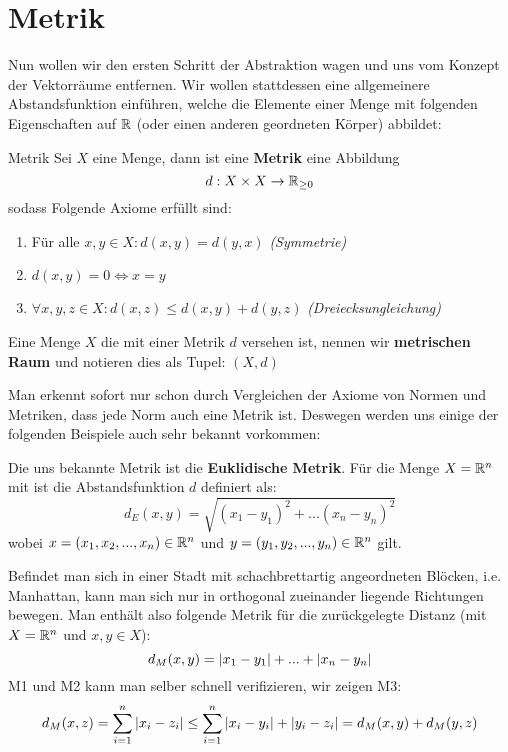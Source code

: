 \section{Metrik}
Nun wollen wir den ersten Schritt der Abstraktion wagen und uns vom Konzept der Vektorräume entfernen. Wir wollen stattdessen eine allgemeinere Abstandsfunktion einführen, welche die Elemente einer Menge mit folgenden Eigenschaften auf $\mathbb{R}$ (oder einen anderen geordneten Körper) abbildet:
\begin{definition}{Metrik}{}
Sei $X$ eine Menge, dann ist eine \textbf{Metrik} eine Abbildung
$$d: X\times X \to \mathbb{R}_{\geq 0}$$
sodass Folgende Axiome erfüllt sind:
\begin{enumerate}[label=M\arabic*)]
    \item Für alle $x,y \in X : d(x,y) = d(y,x)$ \hfill \textit{(Symmetrie)}
    \item $d(x,y) = 0 \iff x=y$
    \item $\forall x,y,z \in X: d(x,z) \leq d(x,y) + d(y,z)$ \hfill \textit{(Dreiecksungleichung)}
\end{enumerate}
Eine Menge $X$ die mit einer Metrik $d$ versehen ist, nennen wir \textbf{metrischen Raum} und notieren dies als Tupel: $(X, d)$
\end{definition}

Man erkennt sofort nur schon durch Vergleichen der Axiome von Normen und Metriken, dass jede Norm auch eine Metrik ist. Deswegen werden uns einige der folgenden Beispiele auch sehr bekannt vorkommen:

\begin{example} Die uns bekannte Metrik ist die \textbf{Euklidische Metrik}. Für die Menge $X = \mathbb{R}^n$ mit ist die Abstandsfunktion $d$ definiert als:
$$d_E(x,y) = \sqrt{(x_1-y_1)^2+...(x_n-y_n)^2}$$
wobei $x = (x_1, x_2, ..., x_n) \in \mathbb{R}^n$ und $y = (y_1, y_2, ..., y_n) \in \mathbb{R}^n$ gilt.
\end{example}

\begin{example} Befindet man sich in einer Stadt mit schachbrettartig angeordneten Blöcken, i.e. Manhattan, kann man sich nur in orthogonal zueinander liegende Richtungen bewegen. Man enthält also folgende Metrik für die zurückgelegte Distanz (mit $X = \mathbb{R}^n$ und $x,y \in X$):
$$d_M(x,y) = \left|x_1 - y_1\right| + ... + \left|x_n - y_n\right|$$
M1 und M2 kann man selber schnell verifizieren, wir zeigen M3:
$$d_M(x,z) = \sum_{i=1}^n \left|x_i-z_i\right| \leq \sum_{i=1}^n \left|x_i-y_i\right| + \left|y_i-z_i\right| = d_M(x,y) + d_M(y,z)$$

\end{example}

